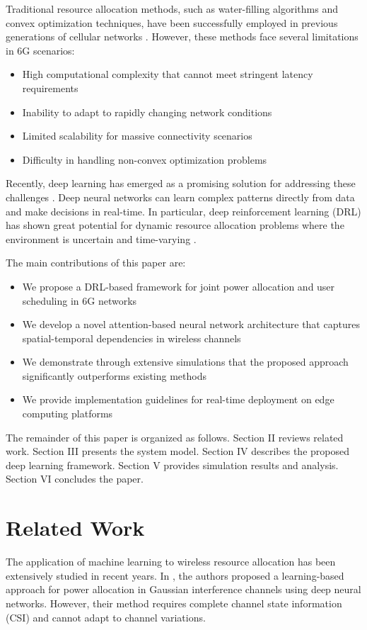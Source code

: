 \documentclass[journal]{IEEEtran}
\begin{document}
Traditional resource allocation methods, such as water-filling algorithms and convex optimization techniques, have been successfully employed in previous generations of cellular networks \cite{Rappaport2013}. However, these methods face several limitations in 6G scenarios:
\begin{itemize}
    \item High computational complexity that cannot meet stringent latency requirements
    \item Inability to adapt to rapidly changing network conditions
    \item Limited scalability for massive connectivity scenarios
    \item Difficulty in handling non-convex optimization problems
\end{itemize}

Recently, deep learning has emerged as a promising solution for addressing these challenges \cite{Chen2018}. Deep neural networks can learn complex patterns directly from data and make decisions in real-time. In particular, deep reinforcement learning (DRL) has shown great potential for dynamic resource allocation problems where the environment is uncertain and time-varying \cite{Sutton2018}.

The main contributions of this paper are:
\begin{itemize}
    \item We propose a DRL-based framework for joint power allocation and user scheduling in 6G networks
    \item We develop a novel attention-based neural network architecture that captures spatial-temporal dependencies in wireless channels
    \item We demonstrate through extensive simulations that the proposed approach significantly outperforms existing methods
    \item We provide implementation guidelines for real-time deployment on edge computing platforms
\end{itemize}

The remainder of this paper is organized as follows. Section II reviews related work. Section III presents the system model. Section IV describes the proposed deep learning framework. Section V provides simulation results and analysis. Section VI concludes the paper.

\section{Related Work}
The application of machine learning to wireless resource allocation has been extensively studied in recent years. In \cite{Eisen2019}, the authors proposed a learning-based approach for power allocation in Gaussian interference channels using deep neural networks. However, their method requires complete channel state information (CSI) and cannot adapt to channel variations.
\end{document}
